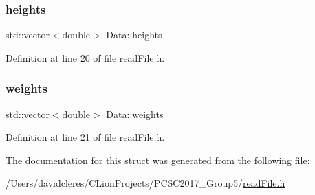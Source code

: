 \subsubsection{\texorpdfstring{heights}{heights}}
{\footnotesize\ttfamily std\+::vector$<$double$>$ Data\+::heights}



Definition at line 20 of file read\+File.\+h.

\mbox{\label{struct_data_a240f15bb7792f4b6326f760f2a5020cd}} 
\subsubsection{\texorpdfstring{weights}{weights}}
{\footnotesize\ttfamily std\+::vector$<$double$>$ Data\+::weights}



Definition at line 21 of file read\+File.\+h.



The documentation for this struct was generated from the following file\+:\begin{DoxyCompactItemize}
\item 
/\+Users/davidcleres/\+C\+Lion\+Projects/\+P\+C\+S\+C2017\+\_\+\+Group5/\mbox{\hyperlink{read_file_8h}{read\+File.\+h}}\end{DoxyCompactItemize}
